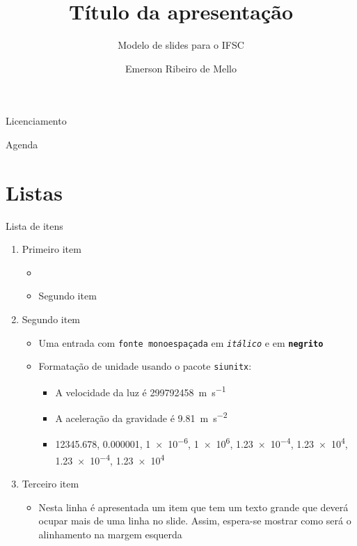 \documentclass[aspectratio=169]{beamer}
\title{Título da apresentação}
\subtitle{Modelo de slides para o IFSC}
\author{Emerson Ribeiro de Mello}
\institute{mello@ifsc.edu.br}
\begin{document}

\begin{frame}
    \maketitle
\end{frame}

\begin{frame}{Licenciamento}
    \licenciamentoLivre
\end{frame}

\begin{frame}{Agenda}
    \tableofcontents
\end{frame}


\section{Listas}


\begin{frame}{Lista de itens}
    \begin{enumerate}
        \item Primeiro item
        \begin{itemize}
            \item {}
            \item Segundo item
        \end{itemize}
        \item Segundo item
        \begin{itemize}
            \item Uma entrada com \texttt{fonte monoespaçada} em \texttt{\textit{itálico}} e em \texttt{\textbf{negrito}}
            \item Formatação de unidade usando o pacote \texttt{siunitx}: 
            \begin{itemize}
                \item A velocidade da luz é \SI{299792458}{\meter\per\second}
                \item A aceleração da gravidade é \SI{9.81}{\meter\per\second\squared}
                \item \num{12345.678}, \num{0.000001}, \num{1e-6}, \num{1e6}, \num{1.23e-4}, \num{1.23e4}, \num{1.23e-4}, \num{1.23e4}
            \end{itemize}
        \end{itemize}

        \item Terceiro item 
        \begin{itemize}
            \item Nesta linha é apresentada um item que tem um texto grande que deverá ocupar mais de uma linha no slide. Assim, espera-se mostrar como será o alinhamento na margem esquerda
        \end{itemize}
    \end{enumerate}
\end{frame}
\end{document}
